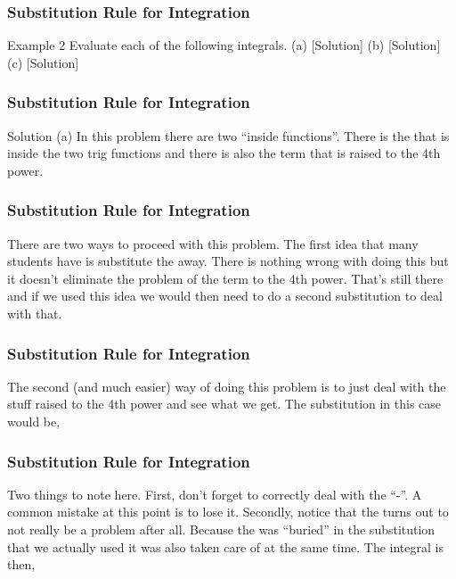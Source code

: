\documentclass{beamer}
\begin{document}
\begin{frame}
	\frametitle{Substitution Rule for Integration}
	\large
Example 2  Evaluate each of the following integrals.
(a)    [Solution]
(b)    [Solution]
(c)    [Solution]

\end{frame}
\begin{frame}
	\frametitle{Substitution Rule for Integration}
	\large
Solution
(a) 
In this problem there are two “inside functions”.  There is the  that is inside the two trig functions and there is also the term that is raised to the 4th power. 
\end{frame}
\begin{frame}
	\frametitle{Substitution Rule for Integration}
	\large
There are two ways to proceed with this problem.  The first idea that many students have is substitute the  away.  There is nothing wrong with doing this but it doesn’t eliminate the problem of the term to the 4th power.  That’s still there and if we used this idea we would then need to do a second substitution to deal with that.
\end{frame}
\begin{frame}
	\frametitle{Substitution Rule for Integration}
	\large
The second (and much easier) way of doing this problem is to just deal with the stuff raised to the 4th power and see what we get.  The substitution in this case would be,
 
\end{frame}
\begin{frame}
	\frametitle{Substitution Rule for Integration}
	\large         
 
Two things to note here.  First, don’t forget to correctly deal with the “-”.  A common mistake at this point is to lose it.  Secondly, notice that the  turns out to not really be a problem after all.  Because the  was “buried” in the substitution that we actually used it was also taken care of at the same time.  The integral is then,
                            
 \end{frame}
\end{document}
